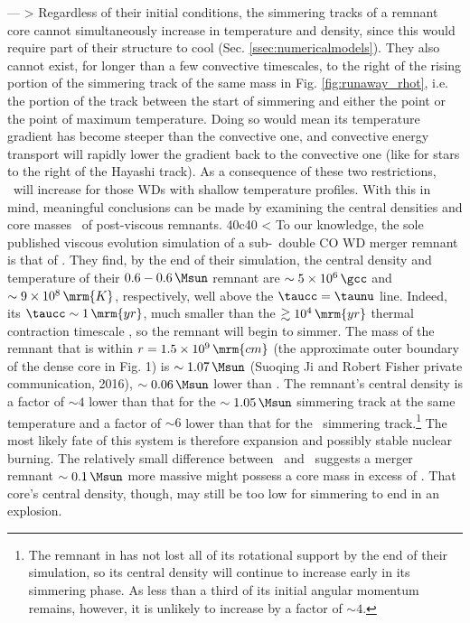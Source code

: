 ---
> Regardless of their initial conditions, the simmering tracks of a remnant core cannot simultaneously increase in temperature and density, since this would require part of their structure to cool (Sec. \ref{ssec:numericalmodels}).  They also cannot exist, for longer than a few convective timescales, to the right of the rising portion of the simmering track of the same mass in Fig. \ref{fig:runaway_rhot}, i.e. the portion of the track between the start of simmering and either the \citeal{wooswk04} point or the point of maximum temperature.  Doing so would mean its temperature gradient has become steeper than the convective one, and convective energy transport will rapidly lower the gradient back to the convective one (like for stars to the right of the Hayashi track).  As a consequence of these two restrictions, \Mcrit\ will increase for those WDs with shallow temperature profiles.  With this in mind, meaningful conclusions can be made by examining the central densities and core masses \Mc\ of post-viscous remnants.
40c40
< To our knowledge, the sole published viscous evolution simulation of a sub-\Mch\ double CO WD merger remnant is that of \cite{ji+13}.  They find, by the end of their simulation, the central density and temperature of their $0.6 - 0.6\,\Msun$ remnant are $\sim5\times10^6\,\gcc$ and $\sim9\times10^8\,\mrm{K}$, respectively, well above the $\taucc = \taunu$ line.  Indeed, its $\taucc \sim 1\,\mrm{yr}$, much smaller than the $\gtrsim 10^4\,\mrm{yr}$ thermal contraction timescale \citep{shen+12}, so the remnant will begin to simmer.  The mass of the remnant that is within $r = 1.5\times10^9\,\mrm{cm}$ (the approximate outer boundary of the dense core in \citealt{ji+13} Fig. 1) is $\sim1.07\,\Msun$ (Suoqing Ji and Robert Fisher private communication, 2016), $\sim0.06\,\Msun$ lower than \Mcrit.  The remnant's central density is a factor of $\sim4$ lower than that for the $\sim1.05\,\Msun$ simmering track at the same temperature and a factor of $\sim6$ lower than that for the \Mcrit\ simmering track.\footnote{The remnant in \citep{ji+13} has not lost all of its rotational support by the end of their simulation, so its central density will continue to increase early in its simmering phase.  As less than a third of its initial angular momentum remains, however, it is unlikely to increase by a factor of $\sim4$.}  The most likely fate of this system is therefore expansion and possibly stable nuclear burning.  The relatively small difference between \Mc\ and \Mcrit\ suggests a merger remnant $\sim0.1\,\Msun$ more massive might possess a core mass in excess of \Mcrit.  That core's central density, though, may still be too low for simmering to end in an explosion.
